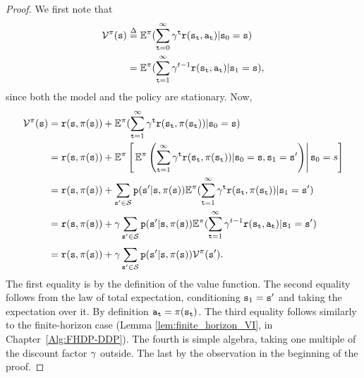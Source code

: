 \begin{proof} We first note that
\begin{align*}
\Value_{}^\policy (\state) &\buildrel \Delta \over = {\E^\policy }(\sum\limits_{\ttime = 0}^\infty  {{\discount ^\ttime}\reward({\state_\ttime},{\action_\ttime})} |{\state_0} = \state)\\
 &= {\E^\policy }(\sum\limits_{\ttime = 1}^\infty  {{\discount ^{t - 1}}\reward({\state_\ttime},{\action_\ttime})} |{\state_1} = \state),
\end{align*}
since both the model and the policy are stationary. Now,
\begin{align*}
\mathcal{V}_{}^\pi ({\tt s}) &= {\tt r}({\tt s},\pi ({\tt s})) + {\mathbb{E}^\pi }(\sum\limits_{{\tt t} = 1}^\infty  {{\gamma^{\tt t}}{\tt r}({{\tt s}_{\tt t}},\pi({{\tt s}_{\tt t}}))} |{{\tt s}_0} = {\tt s})\\
&= {\tt r}({\tt s},\pi ({\tt s})) + {\mathbb{E}^\pi }\left[\left.{\mathbb{E}^\pi }\left(\sum\limits_{{\tt t} = 1}^\infty  {{\gamma^{\tt t}}{\tt r}({{\tt s}_{\tt t}},\pi({{\tt s}_{\tt t}}))} |{{\tt s}_0} = {\tt s}, {\tt s}_1={\tt s}'\right)\right|{{\tt s}_0} = s\right]\\
 &= {\tt r}({\tt s},\pi ({\tt s})) + \sum\limits_{{\tt s}' \in \mathcal{S}}^{} {{\tt p}({\tt s}'|{\tt s},\,} \pi ({\tt s})){\mathbb{E}^\pi }(\sum\limits_{{\tt t} = 1}^\infty  {{\gamma^{\tt t}}{\tt r}({{\tt s}_{\tt t}},\pi({{\tt s}_{\tt t}}))} |{{\tt s}_1} = {\tt s}')\\
 &= {\tt r}({\tt s},\pi ({\tt s})) + \gamma \sum\limits_{{\tt s}' \in \mathcal{S}}^{} {{\tt p}({\tt s}'|{\tt s},\,} \pi ({\tt s})){\mathbb{E}^\pi }(\sum\limits_{{\tt t} = 1}^\infty  {{\gamma^{t - 1}}{\tt r}({{\tt s}_{\tt t}},{{\tt a}_{\tt t}})} |{{\tt s}_1} = {\tt s}')\\
 &= {\tt r}({\tt s},\pi ({\tt s})) + \gamma \sum\limits_{{\tt s}' \in \mathcal{S}}^{} {{\tt p}({\tt s}'|{\tt s},\,} \pi ({\tt s})){\mathcal{V}^\pi }({\tt s}').
\end{align*}
The first equality is by the definition of the value function. The
second equality follows from the law of total expectation,
conditioning ${\tt s}_1 = {\tt s}'$ and taking the expectation over
it. By definition ${{\tt a}_{\tt t}} = \pi ({{\tt s}_{\tt t}})$.
The third equality follows similarly to the finite-horizon case
(Lemma \ref{lem:finite_horizon_VI}, in Chapter~\ref{Alg:FHDP-DDP}).
The fourth is simple algebra, taking one multiple of the discount
factor $\gamma$ outside. The last by the observation in the
beginning of the proof.
\end{proof}

